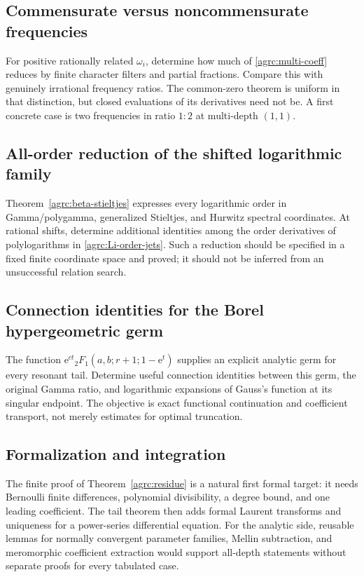 \documentclass[11pt]{article}
\numberwithin{equation}{section}
\theoremstyle{definition}\newtheorem{definition}[theorem]{Definition}
\theoremstyle{remark}\newtheorem{remark}[theorem]{Remark}
\newcommand{\e}{\mathrm e}
\begin{document}
\subsection{Commensurate versus noncommensurate frequencies}
For positive rationally related $\omega_i$, determine how much of
\eqref{agrc:multi-coeff} reduces by finite character filters and
partial fractions. Compare this with genuinely irrational frequency
ratios. The common-zero theorem is uniform in that distinction, but
closed evaluations of its derivatives need not be. A first concrete
case is two frequencies in ratio $1:2$ at multi-depth $(1,1)$.

\subsection{All-order reduction of the shifted logarithmic family}
Theorem~\ref{agrc:beta-stieltjes} expresses every logarithmic order in
Gamma/polygamma, generalized Stieltjes, and Hurwitz spectral coordinates.
At rational shifts, determine additional identities among the order
 derivatives of polylogarithms in \eqref{agrc:Li-order-jets}. Such a
reduction should be specified in a fixed finite coordinate space and
proved; it should not be inferred from an unsuccessful relation search.

\subsection{Connection identities for the Borel hypergeometric germ}
The function $\e^{ct}{}_2F_1(a,b;r+1;1-\e^t)$ supplies an explicit analytic
germ for every resonant tail. Determine useful connection identities
between this germ, the original Gamma ratio, and logarithmic expansions
of Gauss's function at its singular endpoint. The objective is exact
functional continuation and coefficient transport, not merely estimates
for optimal truncation.

\subsection{Formalization and integration}
The finite proof of Theorem~\ref{agrc:residue} is a natural first formal
 target: it needs Bernoulli finite differences, polynomial divisibility,
a degree bound, and one leading coefficient. The tail theorem then adds
formal Laurent transforms and uniqueness for a power-series differential
equation. For the analytic side, reusable lemmas for normally convergent
parameter families, Mellin subtraction, and meromorphic coefficient
extraction would support all-depth statements without separate proofs
for every tabulated case.
\end{document}
